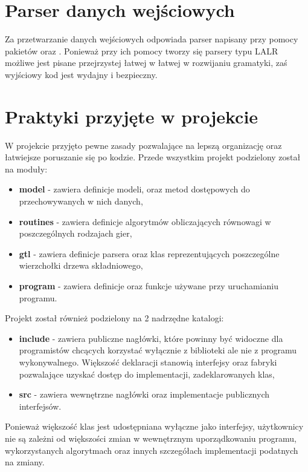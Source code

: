 \documentclass{standalone}
\begin{document}
\section{Parser danych wejściowych}

Za przetwarzanie danych wejściowych odpowiada parser napisany przy pomocy pakietów  oraz . Ponieważ przy ich
pomocy tworzy się parsery typu LALR możliwe jest pisane przejrzystej łatwej w łatwej w rozwijaniu gramatyki, zaś wyjściowy kod jest
wydajny i bezpieczny.

\section{Praktyki przyjęte w projekcie}

W projekcie przyjęto pewne zasady pozwalające na lepszą organizację oraz łatwiejsze poruszanie się po kodzie. Przede wszystkim
projekt podzielony został na moduły:
\begin{itemize}
\item \textbf{model} - zawiera definicje modeli, oraz metod dostępowych do przechowywanych w nich danych,
\item \textbf{routines} - zawiera definicje algorytmów obliczających równowagi w poszczególnych rodzajach gier,
\item \textbf{gtl} - zawiera definicje parsera oraz klas reprezentujących poszczególne wierzchołki drzewa składniowego,
\item \textbf{program} - zawiera definicje oraz funkcje używane przy uruchamianiu programu.
\end{itemize}

Projekt został również podzielony na 2 nadrzędne katalogi:
\begin{itemize}
\item \textbf{include} - zawiera publiczne nagłówki, które powinny być widoczne dla programistów chcących korzystać wyłącznie z biblioteki
ale nie z programu wykonywalnego. Większość deklaracji stanowią interfejsy oraz fabryki pozwalające uzyskać dostęp do implementacji,
zadeklarowanych klas,
\item \textbf{src} - zawiera wewnętrzne nagłówki oraz implementacje publicznych interfejsów.
\end{itemize}
Ponieważ większość klas jest udostępniana wyłączne jako interfejsy, użytkownicy nie są zależni od większości zmian w wewnętrznym uporządkowaniu
programu, wykorzystanych algorytmach oraz innych szczegółach implementacji podatnych na zmiany.
\end{document}
